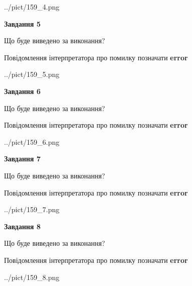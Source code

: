 \documentclass[12pt, ukrainian]{article}
\begin{document}
{\begin{center}
	{../pict/159_4.png}
\end{center}
\newpage

{\begin {center}\textbf{Завдання 5}\end {center}}\par
Що буде виведено за виконання? \par
Повідомлення інтерпретатора про помилку позначати \textbf{error}

\begin{center}
	{../pict/159_5.png}
\end{center}
\newpage

{\begin {center}\textbf{Завдання 6}\end {center}}\par
Що буде виведено за виконання? \par
Повідомлення інтерпретатора про помилку позначати \textbf{error}

\begin{center}
	{../pict/159_6.png}
\end{center}
\newpage

{\begin {center}\textbf{Завдання 7}\end {center}}\par
Що буде виведено за виконання? \par
Повідомлення інтерпретатора про помилку позначати \textbf{error}

\begin{center}
	{../pict/159_7.png}
\end{center}
\newpage

{\begin {center}\textbf{Завдання 8}\end {center}}\par
Що буде виведено за виконання? \par
Повідомлення інтерпретатора про помилку позначати \textbf{error}

\begin{center}
	{../pict/159_8.png}
\end{center}
\newpage

}
\end{document}
